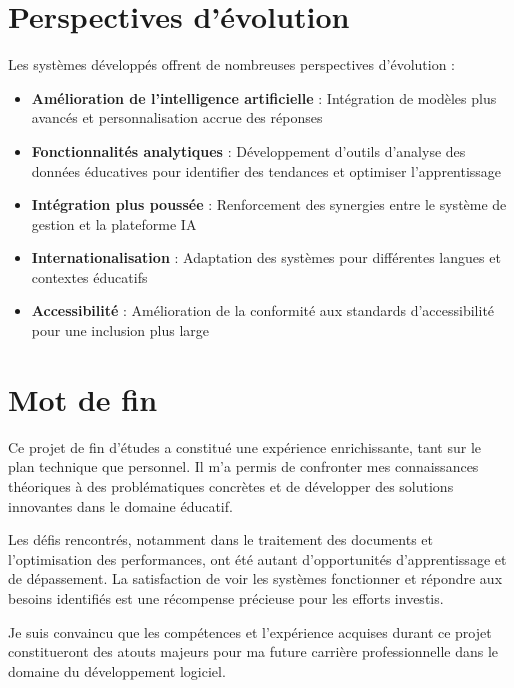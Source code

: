 \documentclass[12pt, a4paper]{report}
\begin{document}
\section{Perspectives d'évolution}

Les systèmes développés offrent de nombreuses perspectives d'évolution :

\begin{itemize}
  \item \textbf{Amélioration de l'intelligence artificielle} : Intégration de modèles plus avancés et personnalisation accrue des réponses
  
  \item \textbf{Fonctionnalités analytiques} : Développement d'outils d'analyse des données éducatives pour identifier des tendances et optimiser l'apprentissage
  
  \item \textbf{Intégration plus poussée} : Renforcement des synergies entre le système de gestion et la plateforme IA
  
  \item \textbf{Internationalisation} : Adaptation des systèmes pour différentes langues et contextes éducatifs
  
  \item \textbf{Accessibilité} : Amélioration de la conformité aux standards d'accessibilité pour une inclusion plus large
\end{itemize}

\section{Mot de fin}

Ce projet de fin d'études a constitué une expérience enrichissante, tant sur le plan technique que personnel. Il m'a permis de confronter mes connaissances théoriques à des problématiques concrètes et de développer des solutions innovantes dans le domaine éducatif.

Les défis rencontrés, notamment dans le traitement des documents et l'optimisation des performances, ont été autant d'opportunités d'apprentissage et de dépassement. La satisfaction de voir les systèmes fonctionner et répondre aux besoins identifiés est une récompense précieuse pour les efforts investis.

Je suis convaincu que les compétences et l'expérience acquises durant ce projet constitueront des atouts majeurs pour ma future carrière professionnelle dans le domaine du développement logiciel.
\end{document}
